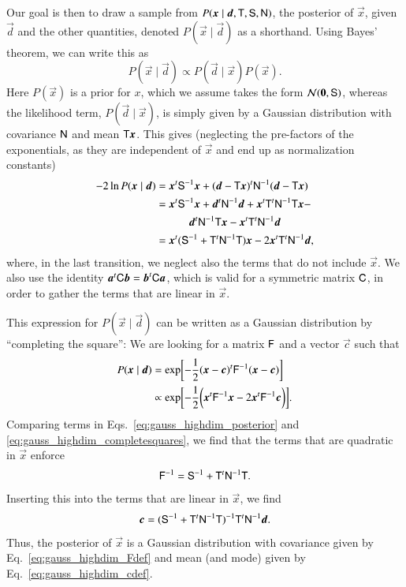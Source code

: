 \documentclass[twocolumn]{aa}
\renewcommand{\d}[0]{\vec{d}}
\newcommand{\x}[0]{\vec{x}}
\renewcommand{\a}[0]{\vec{a}}
\newcommand{\F}[0]{\tens{F}}
\newcommand{\T}[0]{\tens{T}}
\renewcommand{\b}[0]{\vec{b}}
\newcommand{\N}[0]{\tens{N}}
\renewcommand{\C}[0]{\tens{C}}
\renewcommand{\S}[0]{\tens{S}}
\begin{document}
Our goal is then to draw a sample from $P(\x \mid  \d, \T, \S, \N)$, the
posterior of $\x$, given $\d$ and the other quantities, denoted
$P(\x\mid \d)$ as a shorthand. Using Bayes' theorem, we can write this as
\begin{equation}
    P(\x \mid  \d) \propto P(\d \mid  \x) P(\x).
\end{equation}
Here $P(\x)$ is a prior for $x$, which we assume takes the form
$\mathcal{N}(\vec 0, \S)$, whereas the likelihood term, $P(\d \mid  \x)$, is
simply given by a Gaussian distribution with covariance $\N$ and mean $\T\x$.
This gives (neglecting the pre-factors of the exponentials, as they are independent of $\x$ and end up as normalization constants)
\begin{align}
    -2\ln P(\x\mid \d) & = \x^t\S^{-1}\x + (\d-\T\x)^t\N^{-1}(\d - \T\x) \nonumber \\
             & = \x^t\S^{-1}\x + \d^t\N^{-1}\d + \x^t\T^t\N^{-1}\T\x -\nonumber
    \\ &\quad\quad\quad\d^t\N^{-1}\T\x - \x^t\T^t\N^{-1}\d \nonumber \\ 
             & = \x^t(\S^{-1} + \T^t\N^{-1}\T)\x - 2\x^t\T^t\N^{-1}\d,
    \label{eq:gauss_highdim_posterior}
\end{align}
where, in the last transition, we neglect also the terms that do not
include $\x$. We also use the identity $\a^t\C \b = \b^t\C \a$,
which is valid for a symmetric matrix $\C$, in order to gather the
terms that are linear in $\x$.

This expression for $P(\x\mid \d)$ can be written as a Gaussian
distribution by ``completing the square'': We are looking for a matrix
$\F$ and a vector $\vec{c}$ such that
\begin{align}
    P(\x\mid \d) &= \exp\biggl[-\frac{1}{2}(\x - \vec{c})^t\F^{-1}(\x - \vec{c})\biggr] \nonumber \\
             &\propto \exp\biggl[-\frac{1}{2}\biggl(\x^t\F^{-1}\x - 2\x^t\F^{-1}\vec{c}\biggr)\biggr].
    \label{eq:gauss_highdim_completesquares}
\end{align}
Comparing terms in Eqs.~\eqref{eq:gauss_highdim_posterior} and \eqref{eq:gauss_highdim_completesquares}, we find that the terms that are quadratic in $\x$ enforce
\begin{equation}
    \F^{-1} = \S^{-1} + \T^t\N^{-1}\T.
    \label{eq:gauss_highdim_Fdef}
\end{equation}
Inserting this into the terms that are linear in $\x$, we find
\begin{equation}
                       \vec{c} = (\S^{-1}+ \T^t\N^{-1}\T)^{-1}\T^t\N^{-1}\d.
    \label{eq:gauss_highdim_cdef}
\end{equation}
Thus, the posterior of $\x$ is a Gaussian distribution with covariance
given by Eq.~\eqref{eq:gauss_highdim_Fdef} and mean (and mode) given by
Eq.~\eqref{eq:gauss_highdim_cdef}.
\end{document}
